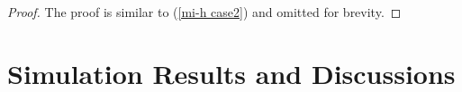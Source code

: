 \documentclass[draftclsnofoot,onecolumn,12pt]{IEEEtran}
\begin{document}
%

\begin{proof}
	The proof is similar to (\ref{mi-h case2}) and omitted for brevity. 
\end{proof}


\section{Simulation Results and Discussions}\label{simulation}

\end{document}
